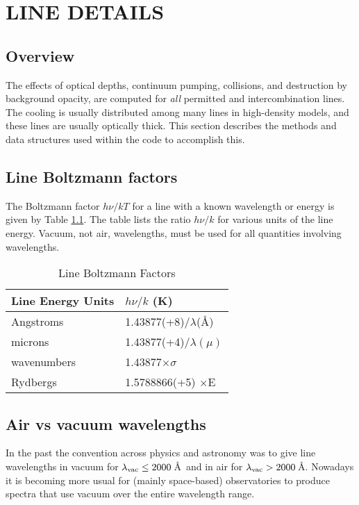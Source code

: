 \chapter{LINE DETAILS }

\section{Overview }

The effects of optical depths, continuum pumping, collisions, and
destruction by background opacity,
are computed for \emph{all} permitted and
intercombination lines.
The cooling is usually distributed among many lines
in high-density models, and these lines are usually optically thick.   This
section describes the methods and data structures used within the code to
accomplish this.

\section{Line Boltzmann factors }

The Boltzmann factor $h\nu/kT$ for a line with a known wavelength or
energy is given by Table \ref{tab:LineBoltzmann}.
The table lists the ratio $h\nu/k$ for various units of
the line energy.
Vacuum, not air, wavelengths, must be used for all
quantities involving wavelengths.

\begin{table}
\centering
\caption{\label{tab:LineBoltzmann}Line Boltzmann Factors }
\begin{tabular}{ll}
\hline
Line Energy Units& $h\nu/k$ (K)\\
\hline
 Angstroms& 1.43877(+8)/$\lambda$(\AA)\\
microns& 1.43877(+4)/$\lambda(\mu)$\\
 wavenumbers& 1.43877$\times \sigma$\\
 Rydbergs& 1.5788866(+5) $\times$E\\
\hline
\end{tabular}
\end{table}

\section{Air vs vacuum wavelengths }

In the past the convention across physics and astronomy was to give line wavelengths
in vacuum for $\lambda_{\rm vac} \le 2000$\,\AA\ and in air for $\lambda_{\rm vac} > 2000$\,\AA.
Nowadays it is becoming more usual for (mainly space-based) observatories to produce spectra
that use vacuum over the entire wavelength range.

